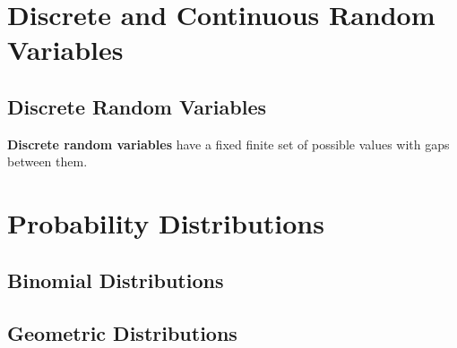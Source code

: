 \documentclass[../AP_Statistics.tex]{subfiles}
\begin{document}
			\section{Discrete and Continuous Random Variables}
				\subsection*{Discrete Random Variables}
					\textbf{Discrete random variables} have a fixed finite set of possible values with gaps between them.
		\section{Probability Distributions}
			\subsection{Binomial Distributions}
			\subsection{Geometric Distributions}
\end{document}
